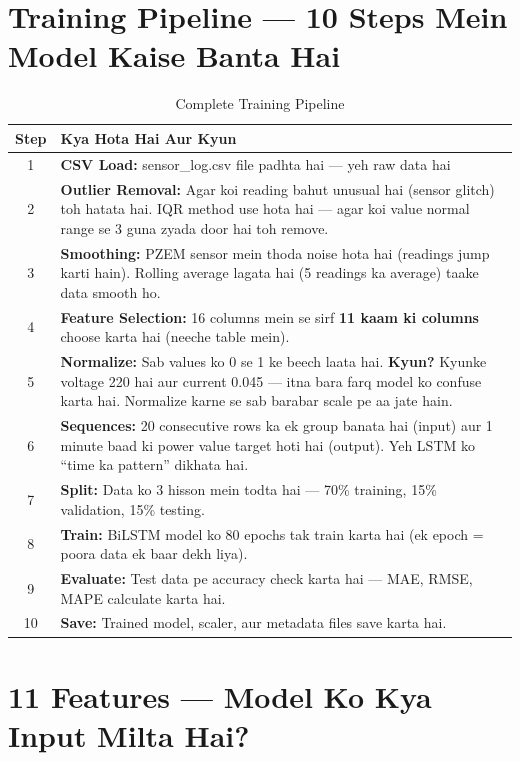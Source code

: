\section{Training Pipeline --- 10 Steps Mein Model Kaise Banta Hai}

\begin{table}[H]
\centering
\begin{tabularx}{\textwidth}{c X}
\toprule
\textbf{Step} & \textbf{Kya Hota Hai Aur Kyun} \\
\midrule
1 & \textbf{CSV Load:} sensor\_log.csv file padhta hai --- yeh raw data hai \\
2 & \textbf{Outlier Removal:} Agar koi reading bahut unusual hai (sensor glitch) toh hatata hai. IQR method use hota hai --- agar koi value normal range se 3 guna zyada door hai toh remove. \\
3 & \textbf{Smoothing:} PZEM sensor mein thoda noise hota hai (readings jump karti hain). Rolling average lagata hai (5 readings ka average) taake data smooth ho. \\
4 & \textbf{Feature Selection:} 16 columns mein se sirf \textbf{11 kaam ki columns} choose karta hai (neeche table mein). \\
5 & \textbf{Normalize:} Sab values ko 0 se 1 ke beech laata hai. \textbf{Kyun?} Kyunke voltage 220 hai aur current 0.045 --- itna bara farq model ko confuse karta hai. Normalize karne se sab barabar scale pe aa jate hain. \\
6 & \textbf{Sequences:} 20 consecutive rows ka ek group banata hai (input) aur 1 minute baad ki power value target hoti hai (output). Yeh LSTM ko ``time ka pattern'' dikhata hai. \\
7 & \textbf{Split:} Data ko 3 hisson mein todta hai --- 70\% training, 15\% validation, 15\% testing. \\
8 & \textbf{Train:} BiLSTM model ko 80 epochs tak train karta hai (ek epoch = poora data ek baar dekh liya). \\
9 & \textbf{Evaluate:} Test data pe accuracy check karta hai --- MAE, RMSE, MAPE calculate karta hai. \\
10 & \textbf{Save:} Trained model, scaler, aur metadata files save karta hai. \\
\bottomrule
\end{tabularx}
\caption{Complete Training Pipeline}
\end{table}

\section{11 Features --- Model Ko Kya Input Milta Hai?}

